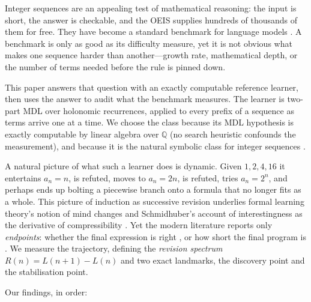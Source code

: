 \documentclass[10pt]{article}
\theoremstyle{definition}
\theoremstyle{plain}
\begin{document}
Integer sequences are an appealing test of mathematical reasoning: the input is
short, the answer is checkable, and the OEIS \citep{oeis} supplies hundreds of
thousands of them for free. They have become a standard benchmark for language
models \citep{dascoli2022,omalley2024}. A benchmark is only as good as its
difficulty measure, yet it is not obvious what makes one sequence harder than
another---growth rate, mathematical depth, or the number of terms needed before
the rule is pinned down.

This paper answers that question with an exactly computable reference learner,
then uses the answer to audit what the benchmark measures. The learner is
two-part MDL \citep{rissanen1978,grunwald2007} over holonomic recurrences,
applied to every prefix of a sequence as terms arrive one at a time. We choose
the class because its MDL hypothesis is exactly computable by linear algebra
over $\mathbb{Q}$ (no search heuristic confounds the measurement), and because
it is the natural symbolic class for integer sequences
\citep{stanley1980,zeilberger1990,kauers2009}.

A natural picture of what such a learner does is dynamic. Given $1, 2, 4, 16$
it entertains $a_n = n$, is refuted, moves to $a_n = 2n$, is refuted, tries
$a_n = 2^{n}$, and perhaps ends up bolting a piecewise branch onto a formula
that no longer fits as a whole. This picture of induction as successive
revision underlies formal learning theory's notion of mind changes
\citep{gold1967,freivalds1993,ambainis1999} and Schmidhuber's account of
interestingness as the derivative of compressibility \citep{schmidhuber2009}.
Yet the modern literature reports only \emph{endpoints}: whether the final
expression is right \citep{dascoli2022}, or how short the final program is
\citep{gauthier2023}. We measure the trajectory, defining the \emph{revision
spectrum} $R(n) = L(n{+}1) - L(n)$ and two exact landmarks, the discovery point
and the stabilisation point.

Our findings, in order:
\end{document}
